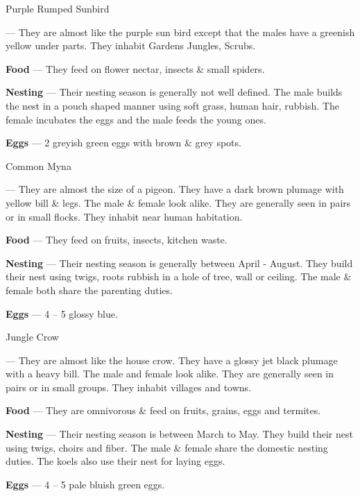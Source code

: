 \begin{bird}{Purple Rumped Sunbird}

 --- They are almost like the purple sun bird except that the males have a greenish yellow under parts. They inhabit Gardens Jungles, Scrubs.

{\large\bf Food} --- They feed on flower nectar, insects \& small spiders.

{\large\bf Nesting} --- Their nesting season is generally not well defined. The male builds the nest in a pouch shaped manner using soft grass, human hair, rubbish.  The female incubates the eggs and the male feeds the young ones.

{\large\bf Eggs} --- 2 greyish green eggs with brown \& grey spots.
\end{bird}

\begin{bird}{Common Myna}

 --- They are almost the size of a pigeon. They have a dark brown plumage with yellow bill \& legs. The male \& female look alike. They are generally seen in pairs or in small flocks. They inhabit near human habitation.

{\large\bf Food} --- They feed on fruits, insects, kitchen waste. 

{\large\bf Nesting} --- Their nesting season is generally between April - August. They build their nest using twigs, roots rubbish in a hole of tree, wall or ceiling. The male \& female both share the parenting duties.

{\large\bf Eggs} --- 4 -- 5 glossy blue.
\end{bird}

\begin{bird}{Jungle Crow}

 --- They are almost like the house crow. They have a glossy jet black plumage with a heavy bill. The male and female look alike. They are generally seen in pairs or in small groups. They inhabit villages and towns. 

{\large\bf Food} --- They are omnivorous \& feed on fruits, grains, eggs and termites.

{\large\bf Nesting} --- Their nesting season is between March to May. They build their nest using twigs, choirs and fiber. The male \& female share the domestic nesting duties. The koels also use their nest for laying eggs. 

{\large\bf Eggs} --- 4 -- 5 pale bluish green eggs.
\end{bird}

